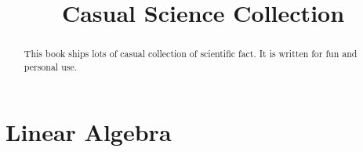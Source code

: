\documentclass[10pt]{book}
\title{Casual Science Collection}
\begin{document}
\begin{abstract}
	This book ships lots of casual collection of scientific fact.
	It is written for fun and personal use.
\end{abstract}

\part{Linear Algebra}
\end{document}
